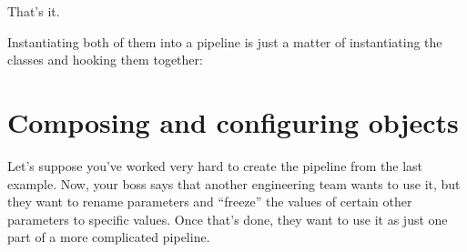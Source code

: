 \documentclass[letterpaper,10pt,english]{sphinxmanual}
\begin{document}
%
\begin{sphinxVerbatim}[commandchars=\\\{\}]
 
     
         

      
             
               
             
\end{sphinxVerbatim}

That’s it.

Instantiating both of them into a pipeline is just a matter of
instantiating the classes and hooking them together:

%
\begin{sphinxVerbatim}[commandchars=\\\{\}]
   
  

  

\end{sphinxVerbatim}


\section{Composing and configuring  objects}
\label{\detokenize{overview:composing-and-configuring-nanonode-objects}}
Let’s suppose you’ve worked very hard to create the pipeline from the
last example. Now, your boss says that another engineering team wants to
use it, but they want to rename parameters and “freeze” the values of
certain other parameters to specific values. Once that’s done, they want
to use it as just one part of a more complicated 
pipeline.
\end{document}
